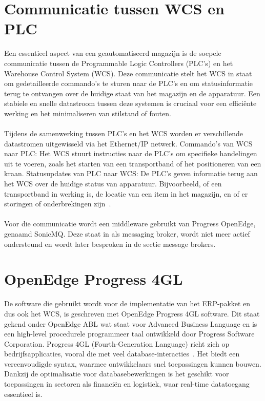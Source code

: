 \section{Communicatie tussen WCS en PLC}
Een essentieel aspect van een geautomatiseerd magazijn is de soepele communicatie tussen de Programmable Logic Controllers (PLC’s) en 
het Warehouse Control System (WCS). 
Deze communicatie stelt het WCS in staat om gedetailleerde commando’s te sturen naar de PLC’s en om statusinformatie terug te ontvangen over de huidige staat van het magazijn en de apparatuur. 
Een stabiele en snelle datastroom tussen deze systemen is cruciaal voor een efficiënte werking en het minimaliseren van stilstand of fouten.
\\\\
Tijdens de samenwerking tussen PLC’s en het WCS worden er verschillende datastromen uitgewisseld via het Ethernet/IP netwerk.
Commando’s van WCS naar PLC: Het WCS stuurt instructies naar de PLC’s om specifieke handelingen uit te voeren, zoals het starten van een transportband of het positioneren van een kraan.
Statusupdates van PLC naar WCS: De PLC’s geven informatie terug aan het WCS over de huidige status van apparatuur. Bijvoorbeeld, of een transportband in werking is, 
de locatie van een item in het magazijn, en of er storingen of onderbrekingen zijn~\autocite{Laar2013}.
\\\\
Voor die communicatie wordt een middleware gebruikt van Progress OpenEdge, genaamd SonicMQ. 
Deze staat in als messaging broker, wordt niet meer actief ondersteund en wordt later besproken in de sectie message brokers.

\section{OpenEdge Progress 4GL} 
De software die gebruikt wordt voor de implementatie van het ERP-pakket en dus ook het WCS, is geschreven met OpenEdge Progress 4GL software.
Dit staat gekend onder OpenEdge ABL wat staat voor Advanced Business Language en is een high-level procedurele programmeer taal ontwikkeld door Progress Software Corporation.
Progress 4GL (Fourth-Generation Language) richt zich op bedrijfsapplicaties, vooral die met veel database-interacties~\autocite{OpenEdge2017}. 
Het biedt een vereenvoudigde syntax, waarmee ontwikkelaars snel toepassingen kunnen bouwen.
Dankzij de optimalisatie voor databasebewerkingen is het geschikt voor toepassingen in sectoren als financiën en logistiek, 
waar real-time datatoegang essentieel is.
 
